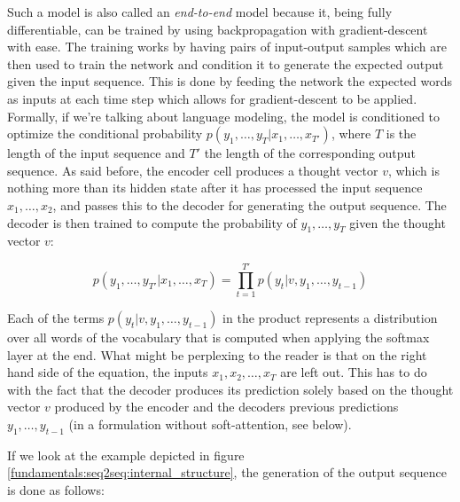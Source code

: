 Such a model is also called an \emph{end-to-end} model because it, being fully differentiable, can be trained by using backpropagation with gradient-descent with ease. The training works by having pairs of input-output samples which are then used to train the network and condition it to generate the expected output given the input sequence. This is done by feeding the network the expected words as inputs at each time step which allows for gradient-descent to be applied. Formally, if we're talking about language modeling, the model is conditioned to optimize the conditional probability $p(y_1, \dots, y_{T}|x_1, \dots, x_{T'})$, where $T$ is the length of the input sequence and $T'$ the length of the corresponding output sequence. As said before, the encoder cell produces a thought vector $v$, which is nothing more than its hidden state after it has processed the input sequence $x_1, \dots, x_2$, and passes this to the decoder for generating the output sequence. The decoder is then trained to compute the probability of $y_1, \dots, y_T$ given the thought vector $v$:

\begin{equation}
p(y_1,\dots,y_{T'}|x_1,\dots,x_{T}) = \prod_{t=1}^{T'} p(y_t|v,y_1,\dots,y_{t-1})
\end{equation}

Each of the terms $p(y_t|v,y_1,\dots,y_{t-1})$ in the product represents a distribution over all words of the vocabulary that is computed when applying the softmax layer at the end. What might be perplexing to the reader is that on the right hand side of the equation, the inputs $x_1,x_2,\dots,x_T$ are left out. This has to do with the fact that the decoder produces its prediction solely based on the thought vector $v$ produced by the encoder and the decoders previous predictions $y_1,\dots,y_{t-1}$ (in a formulation without soft-attention, see below).

If we look at the example depicted in figure \ref{fundamentals:seq2seq:internal_structure}, the generation of the output sequence is done as follows:

